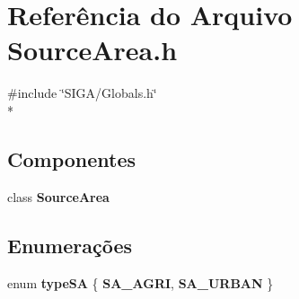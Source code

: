 \section{Referência do Arquivo Source\+Area.\+h}
\label{_source_area_8h}
{\ttfamily \#include \char`\"{}S\+I\+G\+A/\+Globals.\+h\char`\"{}}\\*
\subsection*{Componentes}
\begin{DoxyCompactItemize}
\item 
class {\bf Source\+Area}
\end{DoxyCompactItemize}
\subsection*{Enumerações}
\begin{DoxyCompactItemize}
\item 
enum {\bf type\+SA} \{ {\bf S\+A\+\_\+\+A\+G\+RI}, 
{\bf S\+A\+\_\+\+U\+R\+B\+AN}
 \}
\end{DoxyCompactItemize}

